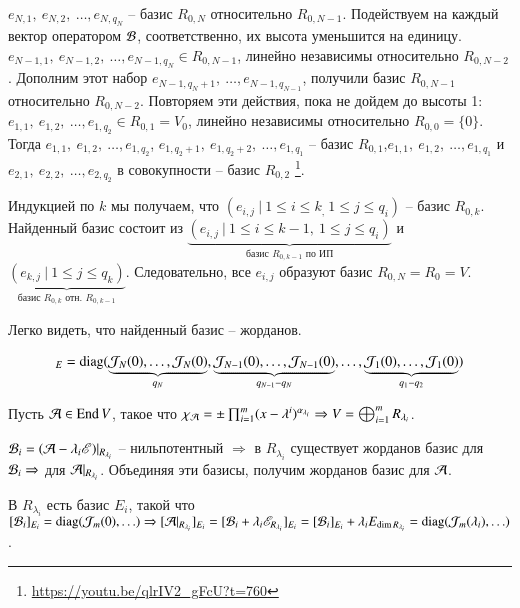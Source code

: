 \documentclass[main]{subfiles}
\begin{document}
$e_{N, 1}, \ e_{N, 2}, \ \ldots, e_{N, q_N}$ -- базис $R_{0, N}$ относительно $R_{0, N-1}$.
Подействуем на каждый вектор оператором $\mathcal{B}$, соответственно, их высота уменьшится на единицу.
$e_{N-1, 1}, \ e_{N-1, 2}, \ \ldots, e_{N-1, q_N} \in R_{0, N-1}$, линейно независимы относительно $ R_{0, N-2}$.
Дополним этот набор $e_{N-1, q_N+1}, \ \ldots, e_{N-1, q_{N-1}}$, получили базис  $R_{0, N-1}$ относительно $R_{0, N-2}$. Повторяем эти действия, пока не дойдем до высоты 1:
$e_{1, 1}, \ e_{1, 2}, \ \ldots, e_{1, q_2} \in R_{0, 1} = V_0$, линейно независимы относительно $ R_{0, 0} = \{0\}$.
Тогда $e_{1, 1}, \ e_{1, 2}, \ \ldots, e_{1, q_2}$, $e_{1, q_2+1}, \ e_{1, q_2+2}, \ \ldots, e_{1, q_1}$ -- базис $R_{0, 1}$,$e_{1, 1}, \ e_{1, 2}, \ \ldots, e_{1, q_1}$ и $e_{2, 1}, \ e_{2, 2}, \ \ldots, e_{2, q_2}$ в совокупности -- базис $R_{0, 2}$ \footnote{\url{https://youtu.be/qlrIV2_gFcU?t=760}}. 


Индукцией по $k$ мы получаем, что $(e_{i,j} \  | \ 1 \leq i \leq k_, \ 1 \leq j \leq q_i)$ -- базис $R_{0, k}$.
Найденный базис состоит из $\underbrace{(e_{i,j} \  | \ 1 \leq i \leq k-1, \ 1 \leq j \leq q_i)}_{\textrm{базис $R_{0, k-1}$ по ИП}}$
и $\underbrace{(e_{k,j} \  | \ 1 \leq j \leq q_k)}_{\textrm{базис $R_{0, k}$ отн. $R_{0, k-1}$}}$. Следовательно, все $e_{i,j}$ образуют базис
$R_{0, N} = R_0 = V$.

Легко видеть, что найденный базис -- жорданов.

\begin{gather*}
  [\mcb]_E = \diag(\underbrace{\mathcal{J}_N(0), \ldots, \mathcal{J}_N(0)}_{q_N}, \underbrace{\mathcal{J}_{N-1}(0), \ldots, \mathcal{J}_{N-1}(0)}_{q_{N-1}-q_N}, \ldots, \underbrace{\mathcal{J}_1(0), \ldots, \mathcal{J}_1(0)}_{q_1-q_2})
\end{gather*}

Пусть $\mathcal{A} \in \operatorname{End} V$, такое что  $\chi_{\mathcal{A}} = \pm \prod_{i=1}^m (x-\lambda^i)^{\alpha_{\lambda_i}} \Rightarrow
  V = \bigoplus_{i=1}^m R_{\lambda_i}$.

$\mathcal{B}_i = (\mathcal{A} - \lambda_i\mathscr{E}) |_{R_{\lambda_i}}$ -- нильпотентный $\Rightarrow$ в $R_{\lambda_i}$ существует жорданов базис для $\mathcal{B}_i \Rightarrow$ для $\mathcal{A}|_{R_{\lambda_i}}$.
Объединяя эти базисы, получим жорданов базис для $\mathcal{A}$.

В $R_{\lambda_i}$ есть базис $E_i$, такой что $[\mathcal{B}_i]_{E_i} = \operatorname{diag}(\mathcal{J}_m(0), \ldots) \Rightarrow
  [\mathcal{A}|_{R_{\lambda_i}}]_{E_i} = [\mathcal{B}_i+\lambda_i \mathscr{E}_{R_{\lambda_i}}]_{E_i} =
    [\mathcal{B}_i]_{E_i}+ \lambda_i E_{\dim R_{\lambda_i}} = \operatorname{diag}(\mathcal{J}_m(\lambda_i), \ldots)$.
\end{document}
